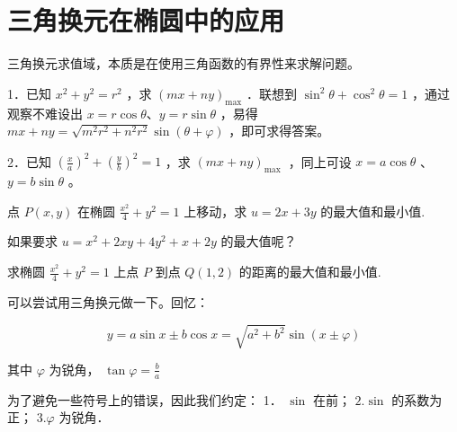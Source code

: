 \section{三角换元在椭圆中的应用}

\begin{definition}
    三角换元求值域，本质是在使用三角函数的有界性来求解问题。

    1．已知 $x^2+y^2=r^2$ ，求 $(m x+n y)_{\text {max}}$ ．联想到 $\sin ^2 \theta+\cos ^2 \theta=1$ ，通过观察不难设出 $x=r \cos \theta $、$y=r \sin \theta$ ，易得 $m x+n y=\sqrt{m^2 r^2+n^2 r^2} \sin (\theta+\varphi)$ ，即可求得答案。

    2．已知 $\left(\frac{x}{a}\right)^2+\left(\frac{y}{b}\right)^2=1$ ，求 $(m x+n y)_{\text {max }}$ ，同上可设 $x=a \cos \theta$ 、 $y=b \sin \theta$ 。
\end{definition}

\begin{example}
    点 $P(x, y)$ 在椭圆 $\frac{x^2}{4}+y^2=1$ 上移动，求 $u = 2x + 3y$ 的最大值和最小值.
\end{example}

\begin{tips}
    如果要求 $u=x^2+2 x y+4 y^2+x+2 y$ 的最大值呢？
\end{tips}

\begin{example}
    求椭圆 $\frac{x^2}{4}+y^2=1$ 上点 $P$ 到点 $Q(1, 2)$ 的距离的最大值和最小值.
\end{example}

\begin{tips}
    可以尝试用三角换元做一下。回忆：

    $$
        y=a \sin x \pm b \cos x=\sqrt{a^2+b^2} \sin (x \pm \varphi)
    $$

    其中 $\varphi$ 为锐角， $\tan \varphi=\frac{b}{a}$

    为了避免一些符号上的错误，因此我们约定：
    1． $\sin$ 在前； $2 . \sin$ 的系数为正； $3 . \varphi$ 为锐角．

\end{tips}
